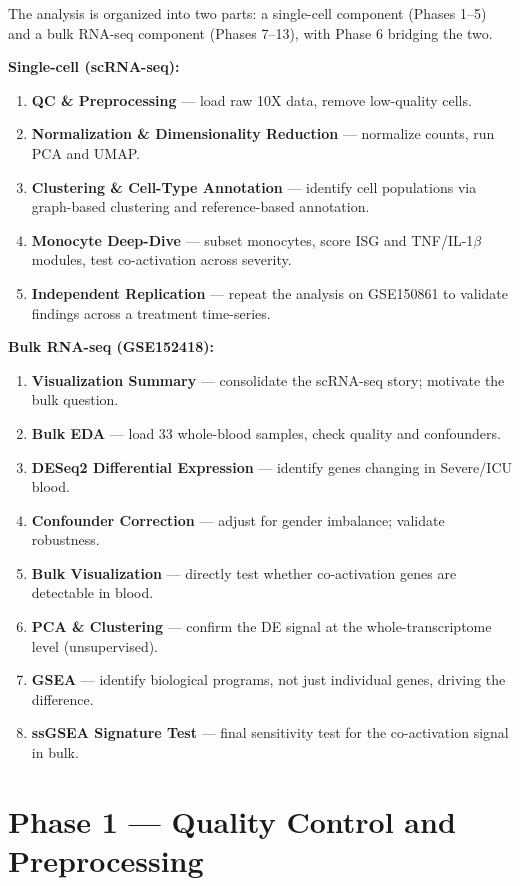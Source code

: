 \documentclass[11pt, a4paper]{article}
\begin{document}
The analysis is organized into two parts: a single-cell component (Phases 1--5) and a bulk
RNA-seq component (Phases 7--13), with Phase 6 bridging the two.

\textbf{Single-cell (scRNA-seq):}
\begin{enumerate}[nosep]
  \item \textbf{QC \& Preprocessing} — load raw 10X data, remove low-quality cells.
  \item \textbf{Normalization \& Dimensionality Reduction} — normalize counts, run PCA and UMAP.
  \item \textbf{Clustering \& Cell-Type Annotation} — identify cell populations via graph-based clustering and reference-based annotation.
  \item \textbf{Monocyte Deep-Dive} — subset monocytes, score ISG and TNF/IL-1$\beta$ modules, test co-activation across severity.
  \item \textbf{Independent Replication} — repeat the analysis on GSE150861 to validate findings across a treatment time-series.
\end{enumerate}

\textbf{Bulk RNA-seq (GSE152418):}
\begin{enumerate}[nosep, start=6]
  \item \textbf{Visualization Summary} — consolidate the scRNA-seq story; motivate the bulk question.
  \item \textbf{Bulk EDA} — load 33 whole-blood samples, check quality and confounders.
  \item \textbf{DESeq2 Differential Expression} — identify genes changing in Severe/ICU blood.
  \item \textbf{Confounder Correction} — adjust for gender imbalance; validate robustness.
  \item \textbf{Bulk Visualization} — directly test whether co-activation genes are detectable in blood.
  \item \textbf{PCA \& Clustering} — confirm the DE signal at the whole-transcriptome level (unsupervised).
  \item \textbf{GSEA} — identify biological programs, not just individual genes, driving the difference.
  \item \textbf{ssGSEA Signature Test} — final sensitivity test for the co-activation signal in bulk.
\end{enumerate}

\section{Phase 1 — Quality Control and Preprocessing}
\end{document}
